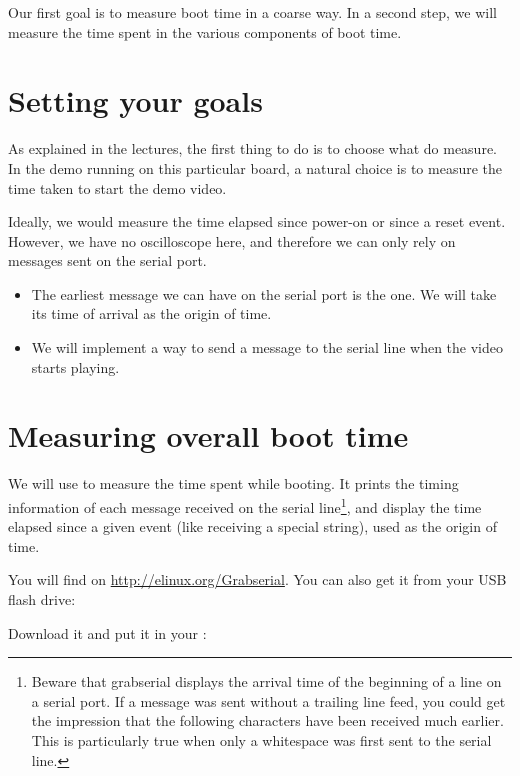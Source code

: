 
Our first goal is to measure boot time in a coarse way. In a second
step, we will measure the time spent in the various components of boot
time.

\section{Setting your goals}

As explained in the lectures, the first thing to do is to choose what do
measure. In the demo running on this particular board, a natural choice is to
measure the time taken to start the demo video.

Ideally, we would measure the time elapsed since power-on or since a
reset event. However, we have no oscilloscope here, and therefore we can only
rely on messages sent on the serial port.

\begin{itemize}
\item The earliest message we can have on the serial port is the
       one. We will take its time of arrival as the origin of
      time.
\item We will implement a way to send a message to the serial line when
      the video starts playing.
\end{itemize}

\section{Measuring overall boot time}

We will use  to measure the time spent while booting.
It prints the timing information of each message received on the
serial line\footnote{Beware that grabserial displays the arrival time
of the beginning of a line on a serial port. If a message was sent
without a trailing line feed, you could get the impression that
the following characters have been received much earlier. This is
particularly true when only a whitespace was first sent to the
serial line.}, and display the time elapsed since a given event (like
receiving a special string), used as the origin of time.

You will find  on \url{http://elinux.org/Grabserial}.
You can also get it from your USB flash drive:

Download it and put it in your :

